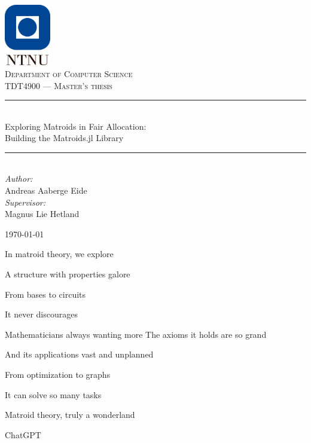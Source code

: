 \documentclass[b5paper]{report}
\begin{document}
\newcommand{\mono}[1]{$\texttt{#1}$}

\begin{titlepage}
  \newcommand{\HRule}{\rule{\linewidth}{0.5mm}}

  \vbox{ }
  \vbox{ }
  \begin{center}
    \includegraphics[width=0.15\textwidth]{ntnu.png}\\[1cm]
    \textsc{\Large Department of Computer Science}\\[1.5cm]
    \textsc{\large TDT4900 --- Master's thesis}\\[0.5cm]
    \vbox{ }

    \HRule \\[0.4cm]
    { \huge Exploring Matroids in Fair Allocation:}\\[0.1cm]
    { \huge Building the Matroids.jl Library}\\[0.1cm]
    \HRule \\[1.5cm]

    \large
    \emph{Author:}\\
    Andreas Aaberge Eide\\[0.5cm]
    \emph{Supervisor:}\\
    Magnus Lie Hetland
    \vfill

    {\large \today\par}
  \end{center}
\end{titlepage}
\cleardoublepage
\newpage

\epigraph{In matroid theory, we explore

A structure with properties galore

From bases to circuits

It never discourages

Mathematicians always wanting more
\newline
\newline
The axioms it holds are so grand

And its applications vast and unplanned

From optimization to graphs

It can solve so many tasks

Matroid theory, truly a wonderland}{ChatGPT}
\thispagestyle{empty}
\end{document}
